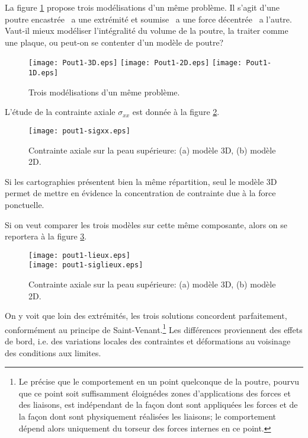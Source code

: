 \bigskip
La figure \ref{Pout1} propose trois modélisations d'un même problème.
Il s'agit d'une poutre encastrée \ a une extrémité et soumise \ a une force
décentrée \ a l'autre.
Vaut-il mieux modéliser l'intégralité du volume de la poutre, la traiter comme
une plaque, ou peut-on se contenter d'un modèle de poutre?
\begin{figure}[ht]
\begin{center}
\texttt{[image: Pout1-3D.eps]} \hfill
\texttt{[image: Pout1-2D.eps]} \hfill
\texttt{[image: Pout1-1D.eps]}
\end{center}
\caption{\label{Pout1} Trois modélisations d'un même problème.}
\end{figure}

\medskip
L'étude de la contrainte axiale $\sigma_{xx}$ est donnée à la figure \ref{Pout1-sigxx}.
\begin{figure}[ht]
\begin{center}
\texttt{[image: pout1-sigxx.eps]}\\[-3mm]
\end{center}
\caption{\label{Pout1-sigxx} Contrainte axiale sur la peau supérieure: (a) modèle 3D,
(b) modèle 2D.}
\end{figure}
Si les cartographies présentent bien la même répartition, seul le modèle 3D
permet de mettre en évidence la concentration de contrainte due à la force ponctuelle.

\medskip
Si on veut comparer les trois modèles sur cette même composante, alors
on se reportera à la figure \ref{Pout1-siglieux}.
\begin{figure}[ht]
\begin{center}
\texttt{[image: pout1-lieux.eps]}\\
\texttt{[image: pout1-siglieux.eps]}\\[-5mm]
\end{center}
\caption{\label{Pout1-siglieux} Contrainte axiale sur la peau supérieure: (a) modèle 3D,
(b) modèle 2D.}
\end{figure}
On y voit que loin des extrémités, les trois solutions concordent parfaitement, conformément 
au principe de Saint-Venant.\footnote{Le  précise que le comportement 
en un point quelconque de la poutre, pourvu que ce point soit suffisamment éloignédes zones 
d'applications des forces et des liaisons, est indépendant de la façon dont sont appliquées 
les forces et de la façon dont sont physiquement réalisées les liaisons; le comportement 
dépend alors uniquement du torseur des forces internes en ce point.} 
Les différences proviennent des effets de bord, i.e. des variations 
locales des contraintes et déformations au voisinage des conditions aux limites.

